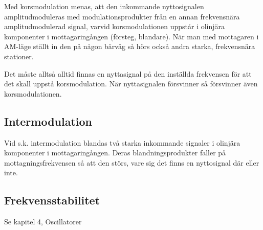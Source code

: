 Med korsmodulation menas, att den inkommande nyttosignalen
amplitudmoduleras med modulationsprodukter från en annan frekvensnära
amplitudmodulerad signal, varvid korsmodulationen uppstår i olinjära
komponenter i mottagaringången (försteg, blandare). När man med
mottagaren i AM-läge ställt in den på någon bärvåg så hörs också andra
starka, frekvensnära stationer.

Det måste alltså alltid finnas en nyttasignal på den inställda
frekvensen för att det skall uppstå korsmodulation. När nyttasignalen
försvinner så försvinner även korsmodulationen.

\subsection{Intermodulation}

Vid s.k. intermodulation blandas två starka inkommande signaler i
olinjära komponenter i mottagaringången. Deras blandningsprodukter
faller på mottagningsfrekvensen så att den störs, vare sig det finns
en nyttosignal där eller inte.

\subsection{Frekvensstabilitet}

Se kapitel 4, Oscillatorer
